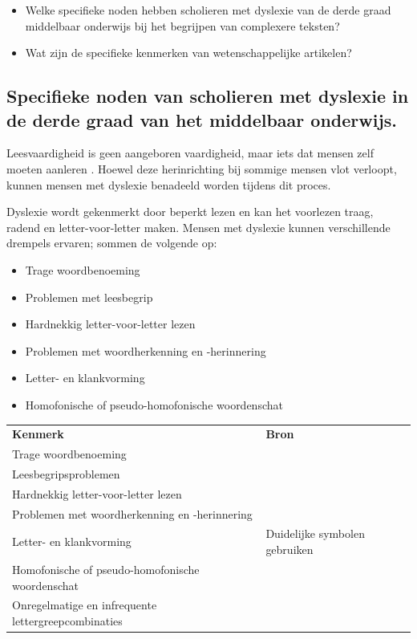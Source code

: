\begin{itemize}
	\item Welke specifieke noden hebben scholieren met dyslexie van de derde graad middelbaar onderwijs bij het begrijpen van complexere teksten?
	\item Wat zijn de specifieke kenmerken van wetenschappelijke artikelen?
\end{itemize}

\subsection{Specifieke noden van scholieren met dyslexie in de derde graad van het middelbaar onderwijs.}

Leesvaardigheid is geen aangeboren vaardigheid, maar iets dat mensen zelf moeten aanleren \autocite{Bonte2020, VanDerMeer2022}. Hoewel deze herinrichting bij sommige mensen vlot verloopt, kunnen mensen met dyslexie benadeeld worden tijdens dit proces. 

\medspace

Dyslexie wordt gekenmerkt door beperkt lezen en kan het voorlezen traag, radend en letter-voor-letter maken. Mensen met dyslexie kunnen verschillende drempels ervaren; \textcite{Gala2016, Bonte2020, RiveroContreras2021, Zhang2021} sommen de volgende op:

\begin{itemize}
	\item Trage woordbenoeming
	\item Problemen met leesbegrip
	\item Hardnekkig letter-voor-letter lezen
	\item Problemen met woordherkenning en -herinnering
	\item Letter- en klankvorming
	\item Homofonische of pseudo-homofonische woordenschat
\end{itemize}

\begin{center}
	\begin{tabular}{ | m{8cm} | m{8cm} | } 
		\hline
		\textbf{Kenmerk} & \textbf{Bron} \\ 
		 Trage woordbenoeming &   \\
		\hline
		 Leesbegripsproblemen &  \\ 
		\hline
		 Hardnekkig letter-voor-letter lezen &  \\ 
		\hline
		 Problemen met woordherkenning en -herinnering &  \\
		\hline
		 Letter- en klankvorming & Duidelijke symbolen gebruiken \\
		\hline
		Homofonische of pseudo-homofonische woordenschat & \\
		\hline
		Onregelmatige en infrequente lettergreepcombinaties & \textcite{Gala2016} \\
		\hline
	\end{tabular}
	\label{table:dyslexia-necessaries}
\end{center}

